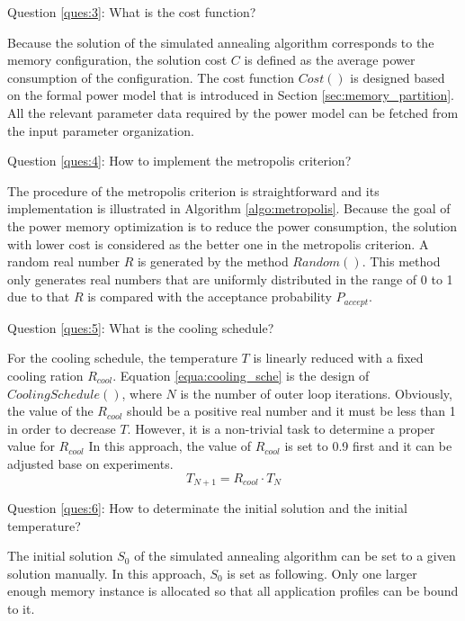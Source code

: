 		Question \ref{ques:3}: What is the cost function?
		
		Because the solution of the simulated annealing algorithm corresponds to the
		memory configuration, the solution cost $C$ is defined as the average power
		consumption of the configuration. The cost function $Cost()$ is designed
		based on the formal power model that is introduced in Section
		\ref{sec:memory_partition}. All the relevant parameter data required by the
		power model can be fetched from the input parameter organization.
	
		Question \ref{ques:4}: How to implement the metropolis criterion?
	
		The procedure of the metropolis criterion is straightforward and its
		implementation is illustrated in Algorithm \ref{algo:metropolis}.
		Because the goal of the power memory optimization is to reduce the
		power consumption, the solution with lower cost is considered as the
		better one in the metropolis criterion.
		A random real number $R$ is generated by the method $Random()$.
		This method only generates real numbers that are uniformly distributed in the
		range of 0 to 1 due to that $R$ is compared with the acceptance probability
		$P_{accept}$.
	
		
	
		Question \ref{ques:5}: What is the cooling schedule?
		
		For the cooling schedule, the temperature $T$ is linearly reduced with a fixed
		cooling ration $R_{cool}$.
		Equation \ref{equa:cooling_sche} is the design of $CoolingSchedule()$, where
		$N$ is the number of outer loop iterations.
		Obviously, the value of the $R_{cool}$ should be a positive real number and
		it must be less than 1 in order to decrease $T$.
		However, it is a non-trivial task to determine a proper value for $R_{cool}$
		In this approach, the value of $R_{cool}$ is set to 0.9 first and it can be
		adjusted base on experiments.
		\begin{equation}
		\label{equa:cooling_sche}
			T_{N+1}=R_{cool} \cdot T_{N}
		\end{equation}
		
		Question \ref{ques:6}: How to determinate the initial solution and the
		initial temperature?
		
		The initial solution $S_{0}$ of the simulated annealing algorithm can be set
		to a given solution manually.
		In this approach, $S_{0}$ is set as following.
		Only one larger enough memory instance is allocated so that all application
		profiles can be bound to it.
		
